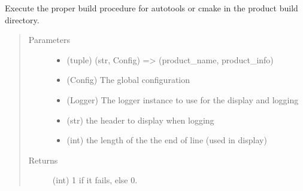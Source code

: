 \documentclass[a4paper,10pt,english]{sphinxmanual}
\begin{document}
\begin{fulllineitems}
\label{\detokenize{apidoc_commands/commands:commands.compile.compile_product_cmake_autotools}}
Execute the proper build procedure for autotools or cmake
in the product build directory.
\begin{quote}\begin{description}
\item[{Parameters}] \leavevmode\begin{itemize}
\item {} 
 \textendash{} (tuple) 
(str, Config) =\textgreater{} (product\_name, product\_info)

\item {} 
 \textendash{} (Config) The global configuration

\item {} 
 \textendash{} (Logger) 
The logger instance to use for the display and logging

\item {} 
 \textendash{} (str) the header to display when logging

\item {} 
 \textendash{} (int) the length of the the end of line (used in display)

\end{itemize}

\item[{Returns}] \leavevmode
(int) 1 if it fails, else 0.

\end{description}\end{quote}

\end{fulllineitems}

\end{document}
